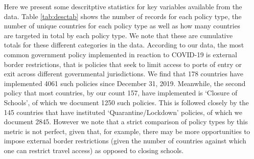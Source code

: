 \documentclass[]{article}
\begin{document}
Here we present some descritptive statistics for key variables available from the data. Table \ref{tab:desctab} shows the number of records for each policy type, the number of unique countries for each policy type as well as how many countries are targeted in total by each policy type. We note that these are cumulative totals for these different categories in the data. According to our data, the most common government policy implemented in reaction to COVID-19 is external border restrictions, that is policies that seek to limit access to ports of entry or exit across different governmental jurisdictions. We find that 178 countries have implemented 4061 such policies since December 31, 2019. Meanwhile, the second policy that most countries, by our count 157, have implemented is `Closure of Schools', of which we document 1250 such policies. This is followed closely by the 145 countries that have instituted `Quarantine/Lockdown' policies, of which we document 2845. However we note that a strict comparison of policy types by this metric is not perfect, given that, for example, there may be more opportunities to impose external border restrictions (given the number of countries against which one can restrict travel access) as opposed to closing schools.
\end{document}

